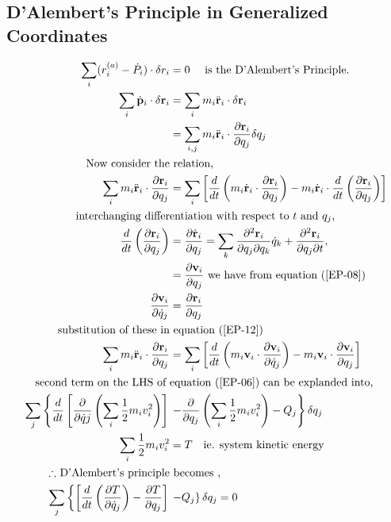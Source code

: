 \subsection{D'Alembert's Principle in Generalized Coordinates}
\begin{align}
\sum\limits_{i}(r_i^{(a)}-\dot{P}_i)\cdot\delta r_i&=0\text{ \quad is the D'Alembert's Principle.}\notag\\
\sum_{i} \dot{\mathbf{p}}_{i} \cdot \delta \mathbf{r}_{i}&=\sum_{i} m_{i} \ddot{\mathbf{r}}_{i} \cdot \delta \mathbf{r}_{i}\notag\\
&=\sum_{i, j} m_{i} \ddot{\mathbf{r}}_{i} \cdot \frac{\partial \mathbf{r}_{i}}{\partial q_{j}} \delta q_{j}\notag\\
\text{Now consider the}&\text{ relation,}\notag\\
\sum_{i} m_{i} \ddot{\mathbf{r}}_{i} \cdot \frac{\partial \mathbf{r}_{i}}{\partial q_{j}}&=\sum_{i}\left[\frac{d}{d t}\left(m_{i} \dot{\mathbf{r}}_{i} \cdot \frac{\partial \mathbf{r}_{i}}{\partial q_{j}}\right)-m_{i} \dot{\mathbf{r}}_{i} \cdot \frac{d}{d t}\left(\frac{\partial \mathbf{r}_{i}}{\partial q_{j}}\right)\right]\label{EP-12}\\
\text{interchanging differ}&\text{entiation with respect to $t$ and $q_j$,}\notag\\
 \frac{d}{d t}\left(\frac{\partial \mathbf{r}_{i}}{\partial q_{j}}\right) &=\frac{\partial \dot{\mathbf{r}}_{i}}{\partial q_{j}}=\sum_{k} \frac{\partial^{2} \mathbf{r}_{i}}{\partial q_{j} \partial q_{k}} \dot{q}_{k}+\frac{\partial^{2} \mathbf{r}_{i}}{\partial q_{j} \partial t}, \notag\\
&=\frac{\partial \mathbf{v}_{i}}{\partial q_{j}}
\text{ we have from equation }(\ref{EP-08})\notag\\
\frac{\partial \mathbf{v}_{i}}{\partial \dot{q}_{j}}&=\frac{\partial \mathbf{r}_{i}}{\partial q_{j}}\label{EP-13}\\
\text{substitution of these in}&\text{ equation (\ref{EP-12})}\notag\\
\sum_{i} m_{i} \ddot{\mathbf{r}}_{i} \cdot \frac{\partial \mathbf{r}_{i}}{\partial q_{j}}&=\sum_{i}\left[\frac{d}{d t}\left(m_{i} \mathbf{v}_{i} \cdot \frac{\partial \mathbf{v}_{i}}{\partial \dot{q}_{j}}\right)-m_{i} \mathbf{v}_{i} \cdot \frac{\partial \mathbf{v}_{i}}{\partial q_{j}}\right]\notag\\
\text{second term on the LHS of }&\text{equation (\ref{EP-06}) can be explanded into,}\notag\\
\sum_{j}\left\{\frac{d}{d t}\left[\frac{\partial}{\partial \dot{q} j}\left(\sum_{i} \frac{1}{2} m_{i} v_{i}^{2}\right)\right]\right. &\left. -\frac{\partial}{\partial q_{j}}\left(\sum_{i} \frac{1}{2} m_{i} v_{i}^{2}\right)-Q_{j}\right\} \delta q_{j}\notag\\
\sum_{i} \frac{1}{2} m_{i} v_{i}^{2}&=T\quad \text{ie. system kinetic energy}\notag\\
\text{$\therefore$ D'Alembert's principle}&\text{ becomes ,}\notag\\
\sum_{j}\left\{\left[\frac{d}{d t}\left(\frac{\partial T}{\partial \dot{q}_{j}}\right)-\frac{\partial T}{\partial q_{j}}\right]\right.& \left. -Q_{j}\right\} \delta q_{j}=0\label{EP-14}
\end{align}
